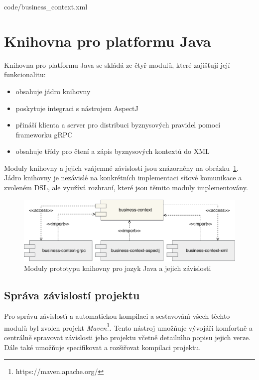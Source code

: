 
{code/business_context.xml}

\section{Knihovna pro platformu Java}

Knihovna pro platformu Java se skládá ze čtyř modulů, které zajišťují
její funkcionalitu:

\begin{itemize}
    \item {} obsahuje jádro knihovny
    \item {} poskytuje integraci s nástrojem AspectJ
    \item {} přináší klienta a server pro distribuci byznysových pravidel pomocí frameworku gRPC
    \item {} obsahuje třídy pro čtení a zápis byznysových kontextů do \gls{XML}
\end{itemize}

Moduly knihovny a jejich vzájemné závislosti jsou znázorněny na obrázku~\ref{fig:modules}.
Jádro knihovny je nezávislé na konkrétních implementaci síťové komunikace a zvoleném
\gls{DSL}, ale využívá rozhraní, které jsou těmito moduly implementovány.

\begin{figure}
    \centering
    \includegraphics[keepaspectratio=true, width=1\linewidth]{figures/library-modules.pdf}
    \caption{Moduly prototypu knihovny pro jazyk Java a jejich závislosti}
    \label{fig:modules}
\end{figure}

\subsection{Správa závislostí projektu}

Pro správu závislost\'{\i} a automatickou kompilaci a sestavován\'{\i}
všech těchto modulů byl zvolen projekt \textit{Maven}\footnote{https://maven.apache.org/}.
Tento nástroj umožňuje v\'yvojáři komfortně a centrálně spravovat závislosti jeho projektu včetně
detailn\'{\i}ho popisu jejich verze. Dále také umožňuje specifikovat a rozšiřovat kompilaci projektu.

